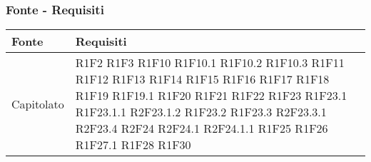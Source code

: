 \subsubsection{Fonte - Requisiti}
\begin{center}
	\begin{longtable}{|p{44mm}|p{22mm}|}
		\hline
		\rowcolor{lighter-grayer}
		\textbf{Fonte} &  \textbf{Requisiti}  \\
		\hline
		\endhead
		

Capitolato &
R1F2 \newline
R1F3 \newline
R1F10 \newline
R1F10.1 \newline
R1F10.2 \newline
R1F10.3 \newline
R1F11 \newline
R1F12 \newline
R1F13 \newline
R1F14 \newline
R1F15 \newline
R1F16 \newline
R1F17 \newline
R1F18 \newline
R1F19 \newline
R1F19.1 \newline
R1F20 \newline
R1F21 \newline
R1F22 \newline
R1F23 \newline
R1F23.1 \newline
R1F23.1.1 \newline
R2F23.1.2 \newline
R1F23.2 \newline
R1F23.3 \newline
R2F23.3.1 \newline
R2F23.4 \newline
R2F24 \newline
R2F24.1 \newline
R2F24.1.1 \newline
R1F25 \newline
R1F26 \newline
R1F27.1 \newline
R1F28 \newline
R1F30 \newline

\end{longtable}
\end{center}
